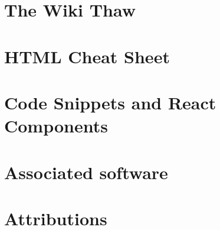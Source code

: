 \documentclass[a4paper, 11pt, twoside]{book}
\begin{document}
\chapter{The Wiki Thaw} \label{ch:thaw}
%
\newpage
%
\chapter{HTML Cheat Sheet} \label{ch:htmlcheatsheet}
%
\newpage
%
\chapter{Code Snippets and React Components} \label{ch:appendix}
%
\newpage

\backmatter
{}
\pagecolor{pgcolor}

\chapter{Associated software} \label{ch:associated-software}


\chapter{Attributions} \label{ch:attributions}

\end{document}
